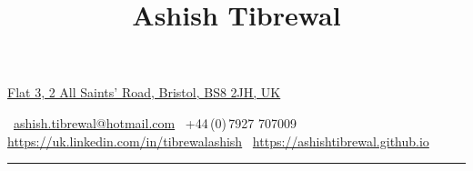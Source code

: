 \documentclass[a4paper,10pt,oneside]{article}
\begin{document}

\title{Ashish Tibrewal}

\begin{subtitle}
\href{https://www.google.co.uk/maps/place/12+Nugent+Hill,+Bristol,+City+of+Bristol+BS6+5TD}
{Flat 3, 2 All Saints' Road, Bristol, BS8 2JH, UK}
\par
\faEnvelope\,
\href{mailto:ashish.tibrewal@hotmail.com}
{ashish.tibrewal@hotmail.com}
\quad \faPhone\,
+44\,(0)\,7927 707009
\quad \faLinkedinSquare\,
\href{https://uk.linkedin.com/in/tibrewalashish}
{https://uk.linkedin.com/in/tibrewalashish}
\quad \faBriefcase\,
\href{https://ashishtibrewal.github.io}
{https://ashishtibrewal.github.io}
\vspace{8pt}
\hrule
\end{subtitle}
\end{document}
